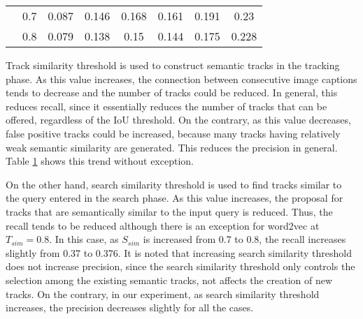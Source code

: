 \begin{table}[tbp]
\begin{tabular}{c|c|ccc|ccc}
          & 0.7   & \cellcolor[rgb]{ .949,  .949,  .949} 0.087 & \cellcolor[rgb]{ .851,  .851,  .851} 0.146 & \cellcolor[rgb]{ .749,  .749,  .749} 0.168 & \cellcolor[rgb]{ .851,  .851,  .851} 0.161 & \cellcolor[rgb]{ .949,  .949,  .949} 0.191 & \cellcolor[rgb]{ .749,  .749,  .749} 0.23 \\
          & 0.8   & 0.079 & \cellcolor[rgb]{ .949,  .949,  .949} 0.138 & \cellcolor[rgb]{ .851,  .851,  .851} 0.15 & 0.144 & \cellcolor[rgb]{ .851,  .851,  .851} 0.175 & \cellcolor[rgb]{ .749,  .749,  .749} 0.228 \\
    \bottomrule
    \end{tabular}%
  \label{tab:tab_1}%
\end{table}%


%
Track similarity threshold is used to construct semantic tracks in the tracking phase. As this value increases, the connection between consecutive image captions tends to decrease and the number of tracks could be reduced. 
In general, this reduces recall, since it essentially reduces the number of tracks that can be offered, regardless of the IoU threshold.
On the contrary, as this value decreases, false positive tracks could be increased, because many tracks having relatively weak semantic similarity are generated. This reduces the precision in general. Table \textcolor{red}{\ref{tab:tab_1}} shows this trend without exception. 

On the other hand, search similarity threshold is used to find tracks similar to the query entered in the search phase. As this value increases, the proposal for tracks that are semantically similar to the input query is reduced. Thus, the recall tends to be reduced although there is an exception for word2vec at $T_{sim} = 0.8$. In this case, as $S_{sim}$ is increased from 0.7 to 0.8, the recall increases slightly from 0.37 to 0.376.
It is noted that increasing search similarity threshold does not increase precision, since the search similarity threshold only controls the selection among the existing semantic tracks, not affects the creation of new tracks. On the contrary, in our experiment, as search similarity threshold increases, the precision decreases slightly for all the cases. 

